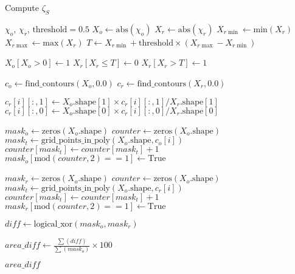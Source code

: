 \begin{algorithm}
    \caption{Compute $\zeta_S$}
    \begin{algorithmic}[1]
        \REQUIRE $\chi_o$, $\chi_r$, $\text{threshold} = 0.5$
        \STATE $X_o \gets \text{abs}(\chi_o)$ 
        \STATE $X_r \gets \text{abs}(\chi_r)$
        \STATE $X_{r\min} \gets \text{min}(X_r)$ 
        \STATE $X_{r\max} \gets \text{max}(X_r)$
        \STATE $T \gets X_{r\min} + \text{threshold} \times (X_{r\max} - X_{r\min})$

        
        \STATE $X_o[X_o > 0] \gets 1$ 
        \STATE $X_r[X_r \le T] \gets 0$
        \STATE $X_r[X_r > T] \gets 1$

        \ENDIF

        \STATE $c_o \gets \text{find\_contours}(X_o, 0.0)$
        \STATE $c_r \gets \text{find\_contours}(X_r, 0.0)$

            \STATE $c_r[i][:, 1] \gets X_o.\text{shape}[1] \times c_r[i][:, 1] / X_r.\text{shape}[1]$
            \STATE $c_r[i][:, 0] \gets X_o.\text{shape}[0] \times c_r[i][:, 0] / X_r.\text{shape}[0]$
        \ENDFOR

        \STATE $mask_o \gets \text{zeros}(X_o.\text{shape})$
        \STATE $counter \gets \text{zeros}(X_o.\text{shape})$
            \STATE $mask_t \gets \text{grid\_points\_in\_poly}(X_o.\text{shape}, c_o[i])$
            \STATE $counter[mask_t] \gets counter[mask_t] + 1$
        \ENDFOR
        \STATE $mask_o[\text{mod}(counter, 2) == 1] \gets \text{True}$

        \STATE $mask_r \gets \text{zeros}(X_o.\text{shape})$
        \STATE $counter \gets \text{zeros}(X_o.\text{shape})$
            \STATE $mask_t \gets \text{grid\_points\_in\_poly}(X_o.\text{shape}, c_r[i])$
            \STATE $counter[mask_t] \gets counter[mask_t] + 1$
        \ENDFOR
        \STATE $mask_r[\text{mod}(counter, 2) == 1] \gets \text{True}$

        \STATE $diff \gets \text{logical\_xor}(mask_o, mask_r)$

        \STATE $area\_diff \gets \frac{\sum(diff)}{\sum(mask_o)} \times 100$

        \RETURN $area\_diff$
    \end{algorithmic}
\end{algorithm}



